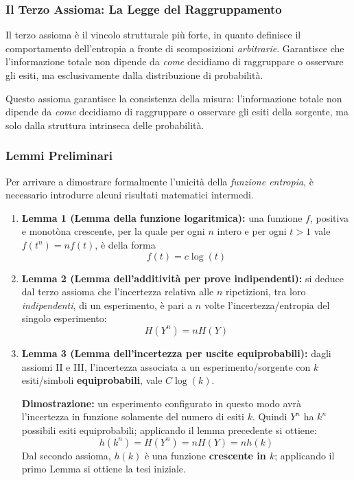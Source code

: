 \subsubsection{Il Terzo Assioma: La Legge del Raggruppamento}

Il terzo assioma è il vincolo strutturale più forte, in quanto definisce il comportamento dell'entropia a fronte di scomposizioni \textit{arbitrarie}. Garantisce che l'informazione totale non dipende da \textit{come} decidiamo di raggruppare o osservare gli esiti, ma esclusivamente dalla distribuzione di probabilità.


Questo assioma garantisce la consistenza della misura: l'informazione totale non dipende da \textit{come} decidiamo di raggruppare o osservare gli esiti della sorgente, ma solo dalla struttura intrinseca delle probabilità.

\subsubsection{Lemmi Preliminari}
Per arrivare a dimostrare formalmente l'unicità della \textit{funzione entropia}, è necessario introdurre alcuni risultati matematici intermedi.

\begin{enumerate}
    \item \textbf{Lemma 1 (Lemma della funzione logaritmica):} una funzione $f$, positiva e monotòna crescente, per la quale per ogni $n$ intero e per ogni $t > 1$ vale $f(t^n)=nf(t)$, è della forma
    \[f(t)= c\log(t)\]
    \item \textbf{Lemma 2 (Lemma dell'additività per prove indipendenti):} si deduce dal terzo assioma che l'incertezza relativa alle $n$ ripetizioni, tra loro \textit{indipendenti}, di un esperimento, è pari a $n$ volte l'incertezza/entropia del singolo esperimento:
    \[H(Y^n)=nH(Y)\]
    \item \textbf{Lemma 3 (Lemma dell'incertezza per uscite equiprobabili):} dagli assiomi II e III, l'incertezza associata a un esperimento/sorgente con $k$ esiti/simboli \textbf{equiprobabili}, vale $C \log(k)$.

    \textbf{Dimostrazione:} un esperimento configurato in questo modo avrà l'incertezza in funzione solamente del numero di esiti $k$. Quindi $Y^n$ ha $k^n$ possibili esiti equiprobabili; applicando il lemma precedente si ottiene:
    \[h(k^n)=H(Y^n)=nH(Y)=nh(k)\]
    Dal secondo assioma, $h(k)$ è una funzione \textbf{crescente in $k$}; applicando il primo Lemma si ottiene la tesi iniziale.
\end{enumerate}


